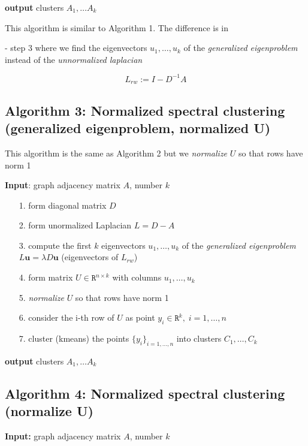 \documentclass[a4paper,12pt]{article}
\begin{document}
\textbf{output} clusters $A_1, \dots A_k$


\bigskip
This algorithm is similar to Algorithm 1. The difference is in

- step 3 where we find the
eigenvectors $u_1 , \dots, u_k$ of the
\textit{generalized eigenproblem} instead of the \textit{unnormalized laplacian}

$$L_{rw} := I - D^{-1} A$$

\subsection{Algorithm 3: Normalized spectral clustering (generalized eigenproblem, normalized U)}

This algorithm is the same as
Algorithm 2 but we \textit{normalize} $U$ so that rows have norm 1

\textbf{Input}: graph adjacency matrix $A$, number $k$
\begin{itemize}
\item[1. ] form diagonal matrix $D$
\item[2. ] form unormalized Laplacian $L = D − A$
\item[3. ] compute the first $k$ eigenvectors $u_1 , \dots, u_k$ of the
\textit{generalized eigenproblem} $L \mathbf{u} = \lambda D \mathbf{u}$
(eigenvectors of $L_{rw}$)
\item[4. ] form matrix $U \in \texttt{R}^{n \times k}$ with columns $u_1, \dots, u_k$
\item[5. ] \textit{normalize} $U$ so that rows have norm 1
\item[6. ] consider the i-th row of $U$ as point $y_i \in \texttt{R}^k, \; i=1, \dots, n$
\item[7. ] cluster (kmeans) the points $\{y_i\}_{i=1, \dots, n}$ into clusters $C_1, \dots, C_k$
\end{itemize}

\textbf{output} clusters $A_1, \dots A_k$

\subsection{Algorithm 4: Normalized spectral clustering (normalize U)}

\textbf{Input:} graph adjacency matrix $A$, number $k$
\end{document}

